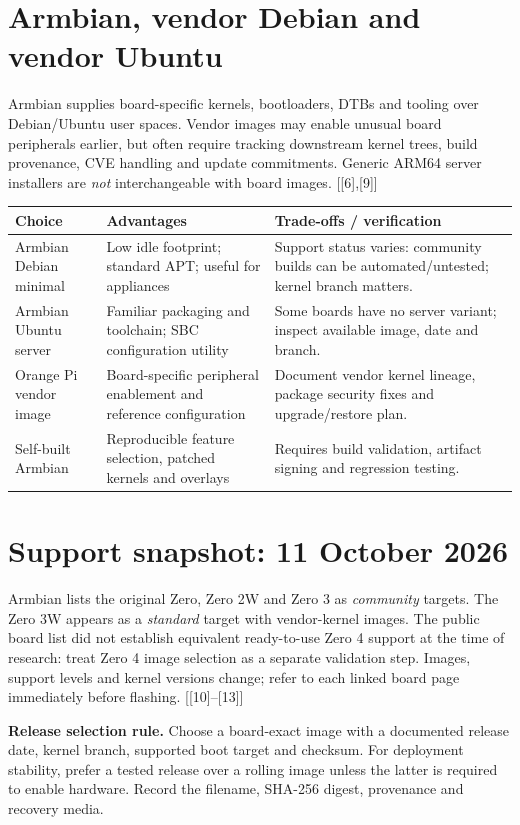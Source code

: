 \documentclass[10pt,oneside,openany]{report}
\newcommand{\smallref}[1]{{\sffamily\scriptsize\color{slate}[#1]}}
\begin{document}
\section{Armbian, vendor Debian and vendor Ubuntu}
Armbian supplies board-specific kernels, bootloaders, DTBs and tooling over Debian/Ubuntu user spaces. Vendor images may enable unusual board peripherals earlier, but often require tracking downstream kernel trees, build provenance, CVE handling and update commitments. Generic ARM64 server installers are \emph{not} interchangeable with board images. \smallref{[6],[9]}
\begin{center}\small\begin{tabularx}{\textwidth}{@{}p{2.35cm}X X@{}}\toprule
\textbf{Choice} & \textbf{Advantages} & \textbf{Trade-offs / verification}\\\midrule
Armbian Debian minimal & Low idle footprint; standard APT; useful for appliances & Support status varies: community builds can be automated/untested; kernel branch matters.\\
Armbian Ubuntu server & Familiar packaging and toolchain; SBC configuration utility & Some boards have no server variant; inspect available image, date and branch.\\
Orange Pi vendor image & Board-specific peripheral enablement and reference configuration & Document vendor kernel lineage, package security fixes and upgrade/restore plan.\\
Self-built Armbian & Reproducible feature selection, patched kernels and overlays & Requires build validation, artifact signing and regression testing.\\\bottomrule\end{tabularx}\end{center}
\section{Support snapshot: 11 October 2026}
Armbian lists the original Zero, Zero 2W and Zero 3 as \emph{community} targets. The Zero 3W appears as a \emph{standard} target with vendor-kernel images. The public board list did not establish equivalent ready-to-use Zero 4 support at the time of research: treat Zero 4 image selection as a separate validation step. Images, support levels and kernel versions change; refer to each linked board page immediately before flashing. \smallref{[10]--[13]}
\begin{fieldnote}
\textbf{Release selection rule.} Choose a board-exact image with a documented release date, kernel branch, supported boot target and checksum. For deployment stability, prefer a tested release over a rolling image unless the latter is required to enable hardware. Record the filename, SHA-256 digest, provenance and recovery media.
\end{fieldnote}
\end{document}
